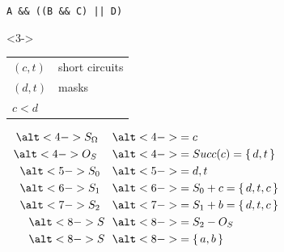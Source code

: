 \documentclass[xcolor = {dvipsnames, table}]{beamer}
\newcommand{\disponslide}[2]{%
    \alt<#1>{#2}{\phantom{#2}}
}
\begin{document}
\begin{frame}[fragile]
    \begin{columns}
        \begin{column}{0.4\textwidth}
            \lstinline{A && ((B && C) || D)}
            \begin{block}{}<3->
                \begin{tabular}{l l}
                    $(c, t)$ & short circuits \\
                    $(d, t)$ & masks \\
                    $c < d$ \\
                \end{tabular}
            \end{block}
            \begin{block}{}
                \begin{align*}
                    \disponslide{4-}{S_\Omega} & \disponslide{4-}{= c} \\
                    \disponslide{4-}{O_S} & \disponslide{4-}{= Succ(c) = \set{d, t}}  \\
                    \disponslide{5-}{S_0} & \disponslide{5-}{= d, t} \\
                    \disponslide{6-}{S_1} & \disponslide{6-}{= S_0 + c = \set{d, t, c}} \\
                    \disponslide{7-}{S_2} & \disponslide{7-}{= S_1 + b = \set{d, t, c}} \\
                    \disponslide{8-}{S}   & \disponslide{8-}{= S_2 - O_S} \\
                    \disponslide{8-}{S}   & \disponslide{8-}{=\set{a, b}} \\
                \end{align*}
            \end{block}
        \end{column}

        \begin{column}{0.4\textwidth}
        \end{column}
    \end{columns}
\end{frame}
\end{document}
